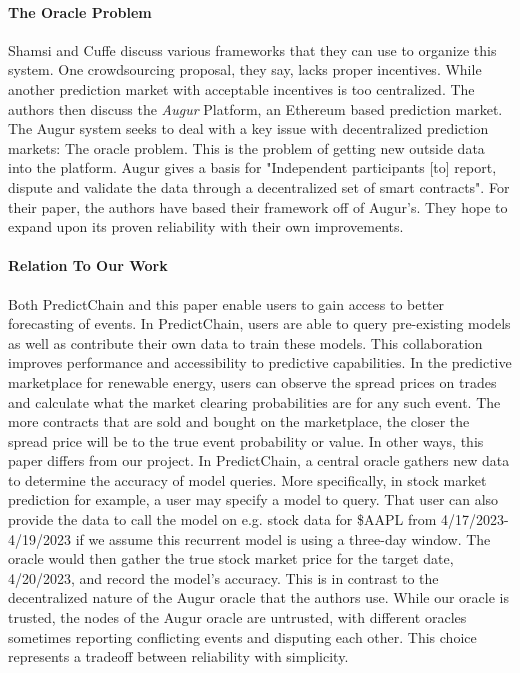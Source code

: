 \documentclass{article}
\begin{document}
    \paragraph{The Oracle Problem}
    Shamsi and Cuffe discuss various frameworks that they can use to organize this system. One crowdsourcing proposal, they
    say, lacks proper incentives. While another prediction market with acceptable incentives is too centralized. The authors
    then discuss the \textit{Augur} Platform, an Ethereum based prediction market. The Augur system seeks to deal with a
    key issue with decentralized prediction markets: The oracle problem. This is the problem of getting new outside data
    into the platform. Augur gives a basis for "Independent participants [to] report, dispute and validate the data
    through a decentralized set of smart contracts".  For their paper, the authors have based their framework off
    of Augur's.  They hope to expand upon its proven reliability with their own improvements.

    \paragraph{Relation To Our Work}
    Both PredictChain and this paper enable users to gain access to better forecasting of events. In PredictChain, users
    are able to query pre-existing models as well as contribute their own data to train these models. This collaboration
    improves performance and accessibility to predictive capabilities. In the predictive marketplace for renewable energy,
    users can observe the spread prices on trades and calculate what the market clearing probabilities are for any such
    event. The more contracts that are sold and bought on the marketplace, the closer the spread price will be to the true
    event probability or value.  In other ways, this paper differs from our project. In PredictChain, a central oracle
    gathers new data to determine the accuracy of model queries. More specifically, in stock market prediction for example, a
    user may specify a model to query. That user can also provide the data to call the model on e.g. stock data for
    \$AAPL from 4/17/2023-4/19/2023 if we assume this recurrent model is using a three-day window. The oracle would then
    gather the true stock market price for the target date, 4/20/2023, and record the model's accuracy.  This is in contrast
    to the decentralized nature of the Augur oracle that the authors use.  While our oracle is trusted, the nodes of
    the Augur oracle are untrusted, with different oracles sometimes reporting conflicting events and disputing each other.
    This choice represents a tradeoff between reliability with simplicity.
\end{document}

